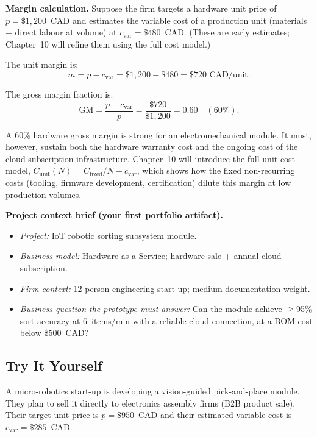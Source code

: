 \textbf{Margin calculation.}
Suppose the firm targets a hardware unit price of
$p = \$1{,}200$~CAD and estimates the variable cost of a production
unit (materials + direct labour at volume) at
$c_{\text{var}} = \$480$~CAD.
(These are early estimates; Chapter~10 will refine them using the
full cost model.)

The unit margin is:
\begin{equation}
  m = p - c_{\text{var}} = \$1{,}200 - \$480 = \$720 \text{ CAD/unit.}
  \label{eq:ch1-margin}
\end{equation}

The gross margin fraction is:
\begin{equation}
  \text{GM} = \frac{p - c_{\text{var}}}{p}
            = \frac{\$720}{\$1{,}200}
            = 0.60 \quad (60\%).
  \label{eq:ch1-gm}
\end{equation}

A 60\% hardware gross margin is strong for an electromechanical module.
It must, however, sustain both the hardware warranty cost and the ongoing
cost of the cloud subscription infrastructure.
Chapter~10 will introduce the full unit-cost model,
$C_{\text{unit}}(N) = C_{\text{fixed}}/N + c_{\text{var}}$,
which shows how the fixed non-recurring costs (tooling, firmware
development, certification) dilute this margin at low production volumes.

\textbf{Project context brief (your first portfolio artifact).}
\begin{itemize}
  \item \emph{Project:} IoT robotic sorting subsystem module.
  \item \emph{Business model:} Hardware-as-a-Service; hardware sale +
        annual cloud subscription.
  \item \emph{Firm context:} 12-person engineering start-up; medium
        documentation weight.
  \item \emph{Business question the prototype must answer:}
        Can the module achieve $\ge$95\% sort accuracy at 6~items/min
        with a reliable cloud connection, at a BOM cost below \$500~CAD?
\end{itemize}

\subsection*{Try It Yourself}

A micro-robotics start-up is developing a vision-guided pick-and-place module.
They plan to sell it directly to electronics assembly firms (B2B product sale).
Their target unit price is $p = \$950$~CAD and their estimated variable cost is
$c_{\text{var}} = \$285$~CAD.

